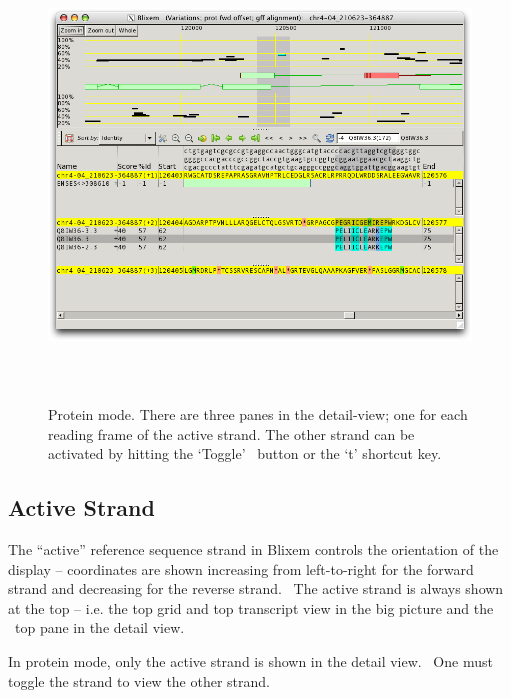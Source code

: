 \documentclass[letterpaper]{article}
\begin{document}
\begin{figure}
\centering
\color[rgb]{0.30980393,0.5058824,0.7411765}
\includegraphics[width=15.231cm,height=11.972cm]{img_window_protein_mode.png}
\caption{Protein mode. There are three
panes in the detail-view; one for each reading frame of the active
strand. The other strand can be activated by hitting the
{\textquoteleft}Toggle{\textquoteright} \ button or the
{\textquoteleft}t{\textquoteright} shortcut key.}
\end{figure}

\bigskip

{\color[rgb]{0.30980393,0.5058824,0.7411765}\subsection[Active Strand]{Active Strand}}
\hypertarget{RefHeading1621056909880}{}{
The {\textquotedblleft}active{\textquotedblright} reference sequence
strand in Blixem controls the orientation of the display -- coordinates
are shown increasing from left-to-right for the forward strand and
decreasing for the reverse strand. \ The active strand is always shown
at the top -- i.e. the top grid and top transcript view in the big
picture and the \ top pane in the detail view.}

\bigskip

{In protein mode, only the active strand is shown in the detail view.
\ One must toggle the strand to view the other strand.}
\end{document}
